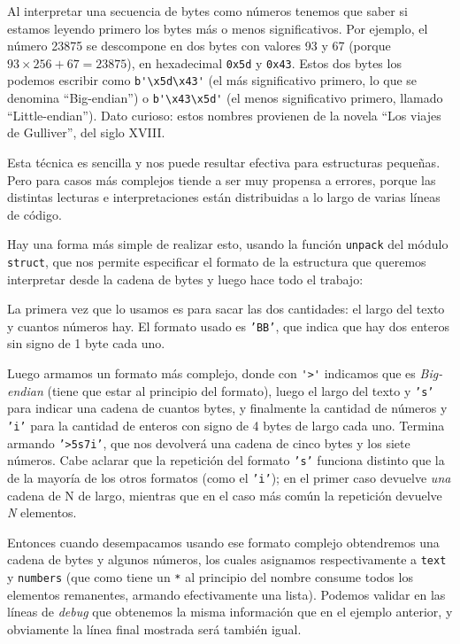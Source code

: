\begin{info}
Al interpretar una secuencia de bytes como números tenemos que saber si estamos leyendo primero los bytes más o menos significativos. Por ejemplo, el número 23875 se descompone en dos bytes con valores 93 y 67 (porque $93 \times 256 + 67 = 23875$), en hexadecimal \texttt{0x5d} y \texttt{0x43}. Estos dos bytes los podemos escribir como \verb|b'\x5d\x43'| (el más significativo primero, lo que se denomina ``Big-endian'') o \verb|b'\x43\x5d'| (el menos significativo primero, llamado ``Little-endian''). Dato curioso: estos nombres provienen de la novela ``Los viajes de Gulliver'', del siglo XVIII.
\end{info}

Esta técnica es sencilla y nos puede resultar efectiva para estructuras pequeñas. Pero para casos más complejos tiende a ser muy propensa a errores, porque las distintas lecturas e interpretaciones están distribuidas a lo largo de varias líneas de código.

Hay una forma más simple de realizar esto, usando la función \texttt{unpack} del módulo \texttt{struct}, que nos permite especificar el formato de la estructura que queremos interpretar desde la cadena de bytes y luego hace todo el trabajo:


La primera vez que lo usamos es para sacar las dos cantidades: el largo del texto y cuantos números hay. El formato usado es \texttt{'BB'}, que indica que hay dos enteros sin signo de 1 byte cada uno. 

Luego armamos un formato más complejo, donde con \verb|'>'| indicamos que es \textit{Big-endian} (tiene que estar al principio del formato), luego el largo del texto y \texttt{'s'} para indicar una cadena de cuantos bytes, y finalmente la cantidad de números y \texttt{'i'} para la cantidad de enteros con signo de 4 bytes de largo cada uno. Termina armando \texttt{'>5s7i'}, que nos devolverá una cadena de cinco bytes y los siete números. Cabe aclarar que la repetición del formato \texttt{'s'} funciona distinto que la de la mayoría de los otros formatos (como el \texttt{'i'}); en el primer caso devuelve \textit{una} cadena de N de largo, mientras que en el caso más común la repetición devuelve \textit{N} elementos.

Entonces cuando desempacamos usando ese formato complejo obtendremos una cadena de bytes y algunos números, los cuales asignamos respectivamente a \texttt{text} y \texttt{numbers} (que como tiene un \texttt{*} al principio del nombre consume todos los elementos remanentes, armando efectivamente una lista). Podemos validar en las líneas de \textit{debug} que obtenemos la misma información que en el ejemplo anterior, y obviamente la línea final mostrada será también igual.

